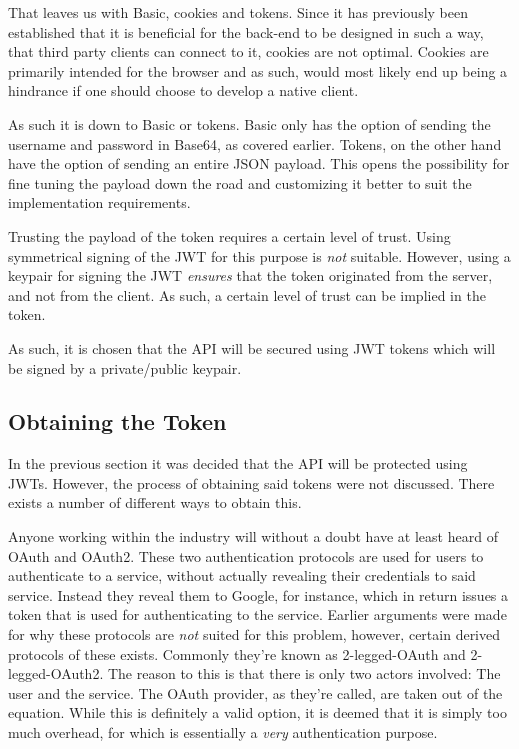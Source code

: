 				That leaves us with Basic, cookies and tokens. Since it has previously been established that it is beneficial for the back-end to be designed in such a way, that third party clients can connect to it, cookies are not optimal. Cookies are primarily intended for the browser and as such, would most likely end up being a hindrance if one should choose to develop a native client.

				As such it is down to Basic or tokens. Basic only has the option of sending the username and password in Base64, as covered earlier. Tokens, on the other hand have the option of sending an entire JSON payload. This opens the possibility for fine tuning the payload down the road and customizing it better to suit the implementation requirements. 

				Trusting the payload of the token requires a certain level of trust. Using symmetrical signing of the JWT for this purpose is \emph{not} suitable. However, using a keypair for signing the JWT \emph{ensures} that the token originated from the server, and not from the client. As such, a certain level of trust can be implied in the token.

				As such, it is chosen that the API will be secured using JWT tokens which will be signed by a private/public keypair.

		\subsection{Obtaining the Token}
			In the previous section it was decided that the API will be protected using JWTs. However, the process of obtaining said tokens were not discussed. There exists a number of different ways to obtain this.

			Anyone working within the industry will without a doubt have at least heard of OAuth and OAuth2. These two authentication protocols are used for users to authenticate to a service, without actually revealing their credentials to said service. Instead they reveal them to Google, for instance, which in return issues a token that is used for authenticating to the service. Earlier arguments were made for why these protocols are \emph{not} suited for this problem, however, certain derived protocols of these exists. Commonly they're known as 2-legged-OAuth and 2-legged-OAuth2. The reason to this is that there is only two actors involved: The user and the service. The OAuth provider, as they're called, are taken out of the equation. While this is definitely a valid option, it is deemed that it is simply too much overhead, for which is essentially a \emph{very} authentication purpose.

